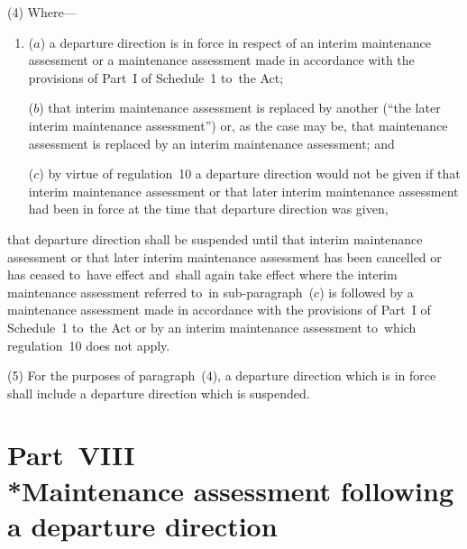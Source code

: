 \documentclass[12pt,a4paper]{article}
\begin{document}
(4) Where—
\begin{enumerate}\item[]
($a$) a departure direction is in force in respect of an interim maintenance
assessment or a maintenance assessment made in accordance with the provisions of
Part~I of Schedule~1 to~the Act;

($b$) that interim maintenance assessment is replaced by another (“the later
interim maintenance assessment”) or, as the case may be, that maintenance
assessment is replaced by an interim maintenance assessment; and

($c$) by virtue of regulation~10 a departure direction would not be given if that
interim maintenance assessment or that later interim maintenance assessment had
been in force at the time that departure direction was given, 
\end{enumerate}
that departure direction shall be suspended until that interim maintenance assessment or that later interim maintenance assessment has been cancelled or has ceased to~have effect and~shall again take effect 
where the interim maintenance assessment referred to~in sub-paragraph~($c$) is followed by a maintenance assessment made in accordance with the provisions of Part~I of Schedule~1 to~the Act or by an interim maintenance assessment to~which regulation~10 does not apply.  %

(5) For the purposes of paragraph~(4), a departure direction which is in force
shall include a departure direction which is suspended.


\section[Part~VIII --- Maintenance assessment following a departure direction]{\sloppy Part~VIII\\*Maintenance assessment following a departure direction}

\renewcommand\parthead{--- Part~VIII}
\end{document}
